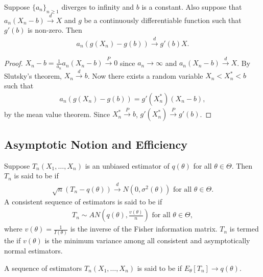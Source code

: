 \begin{proposition}
    Suppose $\{a_{n}\}_{n \geq 1}$ diverges to infinity and $b$ is a constant. Also suppose that $a_{n}(X_{n}-b) \xrightarrow{d} X$ and $g$ be a continuously differentiable function such that $g'(b)$ is non-zero. Then
    \begin{align}
        a_{n}(g(X_{n}) - g(b)) \xrightarrow{d} g'(b)X.
    \end{align}
\end{proposition}

\begin{proof}
    $X_{n} - b = \frac{1}{a_{n}} a_{n}(X_{n}-b) \xrightarrow{P} 0$ since $a_{n} \to \infty$ and $a_{n}(X_{n}-b) \xrightarrow{d} X$. By Slutsky's theorem, $X_{n} \xrightarrow{d} b$. Now there exists a random variable $X_{n} < X_{n}^{\ast} < b$ such that
    \begin{align}
       a_{n} (g(X_{n}) - g(b)) = g'(X_{n}^{\ast})(X_{n}-b),
    \end{align}
    by the mean value theorem. Since $X_{n}^{\ast} \xrightarrow{P} b$, $g'(X_{n}^{\ast}) \xrightarrow{P} g'(b)$.
\end{proof}

\subsection{Asymptotic Notion and Efficiency}

\begin{definition}
    Suppose $T_{n}(X_{1},\ldots,X_{n})$ is an unbiased estimator of $q(\theta)$ for all $\theta \in \Theta$. Then $T_{n}$ is said to be  if
    \begin{align}
        \sqrt{n}(T_{n}-q(\theta)) \xrightarrow{d} N(0,\sigma^{2}(\theta)) \text{ for all } \theta \in \Theta.
    \end{align}
    A consistent sequence of estimators is said to be  if
    \begin{align}
        T_{n} \sim AN(q(\theta),\frac{v(\theta)}{n}) \text{ for all } \theta \in \Theta,
    \end{align}
    where $v(\theta) = \frac{1}{I(\theta)}$ is the inverse of the Fisher information matrix. $T_{n}$ is termed the  if $v(\theta)$ is the minimum variance among all consistent and asymptotically normal estimators.
\end{definition}

\begin{definition}
    A sequence of estimators $T_{n}(X_{1},\ldots,X_{n})$ is said to be  if $E_{\theta}[T_{n}] \to q(\theta)$.
\end{definition}

